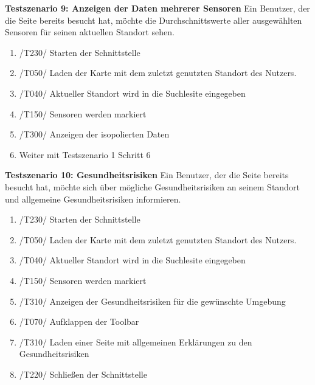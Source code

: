\textbf{Testszenario 9: Anzeigen der Daten mehrerer Sensoren}
\newline
Ein Benutzer, der die Seite bereits besucht hat, möchte die Durchschnittswerte aller ausgewählten Sensoren für seinen aktuellen Standort sehen.
\begin{enumerate} [noitemsep]
    \item /T230/ Starten der Schnittstelle
    \item /T050/ Laden der Karte mit dem zuletzt genutzten Standort des Nutzers.
    \item /T040/ Aktueller Standort wird in die Suchlesite eingegeben
    \item /T150/ Sensoren werden markiert
    \item /T300/ Anzeigen der isopolierten Daten
    \item Weiter mit Testszenario 1 Schritt 6
\end{enumerate}

\textbf{Testszenario 10: Gesundheitsrisiken}
\newline
Ein Benutzer, der die Seite bereits besucht hat, möchte sich über mögliche Gesundheitsrisiken an seinem Standort und allgemeine Gesundheitsrisiken informieren.
\begin{enumerate} [noitemsep]
    \item /T230/ Starten der Schnittstelle
    \item /T050/ Laden der Karte mit dem zuletzt genutzten Standort des Nutzers.
    \item /T040/ Aktueller Standort wird in die Suchlesite eingegeben
    \item /T150/ Sensoren werden markiert
    \item /T310/ Anzeigen der Gesundheitsrisiken für die gewünschte Umgebung
    \item /T070/ Aufklappen der Toolbar
    \item /T310/ Laden einer Seite mit allgemeinen Erklärungen zu den Gesundheitsrisiken
    \item /T220/ Schließen der Schnittstelle
\end{enumerate}

